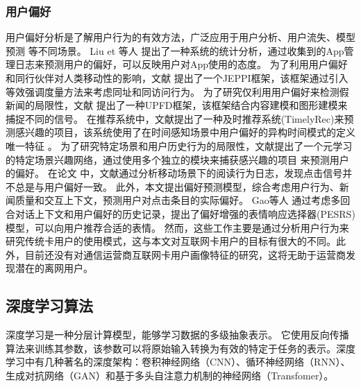 \subsubsection{用户偏好}
用户偏好分析是了解用户行为的有效方法，广泛应用于用户分析、用户流失、模型预测
等不同场景。%
Liu et 等人\cite{liu2017deriving}
提出了一种系统的统计分析，通过收集到的App管理日志来预测用户的偏好，可以反映用户对App使用的态度。%
为了利用用户偏好和同行伙伴对人类移动性的影响，文献\cite{hu2020exploiting}
提出了一个JEPPI框架，该框架通过引入等效强调度量方法来考虑同址和同访问行为。%
为了研究仅利用用户偏好来检测假新闻的局限性，文献\cite{dou2021user}
提出了一种UPFD框架，该框架结合内容建模和图形建模来捕捉不同的信号。%
在推荐系统中，文献\cite{zhang2020general}提出了一种及时推荐系统(TimelyRec)来预测感兴趣的项目，该系统使用了在时间感知场景中用户偏好的异构时间模式的定义唯一特征
。%
为了研究特定场景和用户历史行为的局限性，文献\cite{tian2020cohort}提出了一个元学习的特定场景兴趣网络，通过使用多个独立的模块来捕获感兴趣的项目
来预测用户的偏好。%
在论文\cite{lu2018between}
中，文献通过分析移动场景下的阅读行为日志，发现点击信号并不总是与用户偏好一致。%
此外，本文提出偏好预测模型，综合考虑用户行为、新闻质量和交互上下文，预测用户对点击条目的实际偏好。
Gao等人\cite{gao2021learning}
通过考虑多回合对话上下文和用户偏好的历史记录，提出了偏好增强的表情响应选择器(PESRS)模型，可以向用户推荐合适的表情。%
然而，这些工作主要是通过分析用户行为来研究传统卡用户的使用模式，这与本文对互联网卡用户的目标有很大的不同。此外，目前还没有对通信运营商互联网卡用户画像特征的研究，这将无助于运营商发现潜在的离网用户。

\subsection{深度学习算法}
深度学习是一种分层计算模型，能够学习数据的多级抽象表示。%
它使用反向传播算法来训练其参数，该参数可以将原始输入转换为有效的特定于任务的表示。深度学习中有几种著名的深度架构：卷积神经网络（CNN）、循环神经网络（RNN）、生成对抗网络（GAN）和基于多头自注意力机制的神经网络（Transfomer）。%

